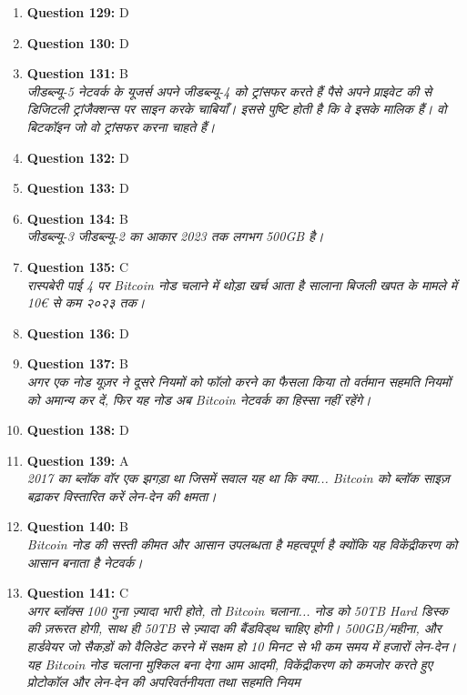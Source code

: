 \documentclass[12pt,a4paper]{article}
\begin{document}
\begin{enumerate}
\item \textbf{Question 129:} D

\item \textbf{Question 130:} D

\item \textbf{Question 131:} B
\\ \textit{जीडब्ल्यू-5 नेटवर्क के यूजर्स अपने जीडब्ल्यू-4 को ट्रांसफर करते हैं पैसे अपने प्राइवेट की से डिजिटली ट्रांजैक्शन्स पर साइन करके चाबियाँ। इससे पुष्टि होती है कि वे इसके मालिक हैं। वो बिटकॉइन जो वो ट्रांसफर करना चाहते हैं।}

\item \textbf{Question 132:} D

\item \textbf{Question 133:} D

\item \textbf{Question 134:} B
\\ \textit{जीडब्ल्यू-3 जीडब्ल्यू-2 का आकार 2023 तक लगभग 500GB है।}

\item \textbf{Question 135:} C
\\ \textit{रास्पबेरी पाई 4 पर Bitcoin नोड चलाने में थोड़ा खर्च आता है सालाना बिजली खपत के मामले में 10€ से कम २०२३ तक।}

\item \textbf{Question 136:} D

\item \textbf{Question 137:} B
\\ \textit{अगर एक नोड यूज़र ने दूसरे नियमों को फॉलो करने का फैसला किया तो वर्तमान सहमति नियमों को अमान्य कर दें, फिर यह नोड अब Bitcoin नेटवर्क का हिस्सा नहीं रहेंगे।}

\item \textbf{Question 138:} D

\item \textbf{Question 139:} A
\\ \textit{2017 का ब्लॉक वॉर एक झगड़ा था जिसमें सवाल यह था कि क्या... Bitcoin को ब्लॉक साइज़ बढ़ाकर विस्तारित करें लेन-देन की क्षमता।}

\item \textbf{Question 140:} B
\\ \textit{Bitcoin नोड की सस्ती कीमत और आसान उपलब्धता है महत्वपूर्ण है क्योंकि यह विकेंद्रीकरण को आसान बनाता है नेटवर्क।}

\item \textbf{Question 141:} C
\\ \textit{अगर ब्लॉक्स 100 गुना ज़्यादा भारी होते, तो Bitcoin चलाना... नोड को 50TB Hard डिस्क की ज़रूरत होगी, साथ ही 50TB से ज़्यादा की बैंडविड्थ चाहिए होगी। 500GB/महीना, और हार्डवेयर जो सैकड़ों को वैलिडेट करने में सक्षम हो 10 मिनट से भी कम समय में हजारों लेन-देन। यह Bitcoin नोड चलाना मुश्किल बना देगा आम आदमी, विकेंद्रीकरण को कमजोर करते हुए प्रोटोकॉल और लेन-देन की अपरिवर्तनीयता तथा सहमति नियम}


\end{enumerate}
\end{document}
